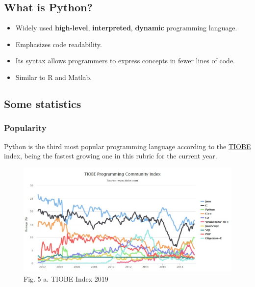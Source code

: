 \documentclass[11pt]{article}
\makeatletter
\def\maxwidth{\ifdim\Gin@nat@width>\linewidth\linewidth
    \else\Gin@nat@width\fi}
\let\Oldincludegraphics\includegraphics
\renewcommand{\includegraphics}[1]{\Oldincludegraphics[width=.8\maxwidth]{#1}}
\providecommand{\tightlist}{%
      \setlength{\itemsep}{0pt}\setlength{\parskip}{0pt}}
\makeatother
\begin{document}
    \hypertarget{what-is-python}{%
\subsection{What is Python?}\label{what-is-python}}

\begin{itemize}
\tightlist
\item
  Widely used \textbf{high-level}, \textbf{interpreted},
  \textbf{dynamic} programming language.
\item
  Emphasizes code readability.
\item
  Its syntax allows programmers to express concepts in fewer lines of
  code.
\item
  Similar to R and Matlab.
\end{itemize}

    \hypertarget{some-statistics}{%
\subsection{Some statistics}\label{some-statistics}}

    \hypertarget{popularity}{%
\subsubsection{Popularity}\label{popularity}}

    Python is the third most popular programming language according to the
\href{https://www.tiobe.com/tiobe-index/}{TIOBE} index, being the
fastest growing one in this rubric for the current year.

    \begin{figure}[H]
\centering
\includegraphics{figs/tiobe.jpg}
\caption{Fig. 5 a. TIOBE Index 2019}
\end{figure}
\end{document}
